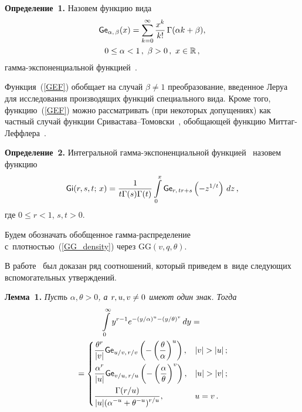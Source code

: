 \begin{multicols}{2}
\smallskip

\noindent
\textbf{Определение~1.}
Назовем функцию вида
\begin{multline}
\label{GEF}
{\sf Ge}_{\alpha,\, \beta} (x) = \sum\limits_{k=0}^{\infty}\displaystyle\frac{\displaystyle x^k\mathstrut}{\displaystyle k!\mathstrut}\, \Gamma(\alpha k + 
\beta), \\
 0\le\alpha<1\,, \ \beta> 0\,, \  x\in\mathbb{R}\,,
\end{multline}
гамма-экспоненциальной функцией~\cite{KuTi2017}.

\smallskip

Функция~(\ref{GEF}) обобщает на случай $\beta\neq1$ преобразование, введенное 
Леруа~\cite{LeRoy1900_1} для исследования производящих функций специального 
вида. Кроме того, функцию~(\ref{GEF}) можно рассматривать (при некоторых 
допущениях) как частный случай функции Сри\-ва\-ста\-ва--То\-мов\-ски~\cite{SrTo2009}, 
обобщающей функцию Мит\-таг-Леф\-фле\-ра~\cite{GoKiMaRo2014}.

\smallskip

\noindent
\textbf{Определение~2.}
Интегральной гамма-экс\-по\-нен\-ци\-аль\-ной функцией~\cite{KuPaSh2019_2} 
назовем функцию
$$
{\sf Gi}(r,s,t;\,x)=\displaystyle\frac{\displaystyle 1 \mathstrut}{\displaystyle t\Gamma(s)\Gamma(t)\mathstrut}\int\limits_{0}^{x} 
{\sf Ge}_{r,\,tr+s}\left(-z^{1/t}\right) \, dz\,,
$$
где $0\le r<1$, $s,t>0$.

\smallskip


Будем обозначать обобщенное гам\-ма-рас\-пре\-де\-ле\-ние с~плотностью~(\ref{GG_density})
через $\mathrm{GG}(v,q,\theta)$.

В работе~\cite{Ku2019_1} был доказан ряд соотношений, который приведем в~виде 
сле\-ду\-ющих вспомогательных утверждений.

\smallskip

\noindent
\textbf{Лемма~1.}
\textit{Пусть $\alpha,\theta>0$, а $r,u,v\hm\neq0$ имеют один знак. Тогда}
\begin{multline*}
\int\limits_0^{\infty}y^{r-1}e^{-(y/\alpha)^u-(y/\theta)^v} \, dy ={}\\
{}=
 \begin{cases}
   \displaystyle \frac{\theta^{r}}{|v|}{\sf Ge}_{u/v,\,r/v}\left(-
\left(\fr{\theta}{\alpha}\right)^{u}\right), & |v|>|u|\,;\\[9pt]
   \displaystyle \fr{\alpha^{r}}{|u|}{\sf Ge}_{v/u,\,r/u}\left(-
\left(\fr{\alpha}{\theta}\right)^{v}\right), &|u|>|v|\,;\\[9pt]
   \displaystyle \fr{\Gamma(r/u)}{|u|(\alpha^{-u}+\theta^{-u})^{r/u}}, 
&u = v\,.
 \end{cases}
\end{multline*}


\end{multicols}
